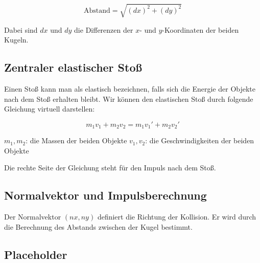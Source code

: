 \documentclass[11pt,a4paper]{article}
\begin{document}
\[
\text{Abstand} = \sqrt{(dx)^2 + (dy)^2}
\]

Dabei sind \(dx\) und \(dy\) die Differenzen der \(x\)- und \(y\)-Koordinaten der beiden Kugeln.

\subsection{Zentraler elastischer Stoß}


Einen Stoß kann man als elastisch bezeichnen, falls sich die Energie der Objekte nach dem Stoß erhalten bleibt. Wir können den elastischen Stoß durch folgende Gleichung virtuell darstellen:

\[
m_1 v_1 + m_2 v_2 = m_1 v_1' + m_2 v_2'
\]

\begin{outline}
	\1 $m_1, m_2$: die Massen der beiden Objekte
	\1 $v_1, v_2$: die Geschwindigkeiten der beiden Objekte
\end{outline}

Die rechte Seite der Gleichung steht für den Impuls nach dem Stoß.



\subsection{Normalvektor und Impulsberechnung}
Der Normalvektor \((nx, ny)\) definiert die Richtung der Kollision. Er wird durch die Berechnung des Abstands zwischen der Kugel bestimmt.


\subsection{Placeholder}
\end{document}
